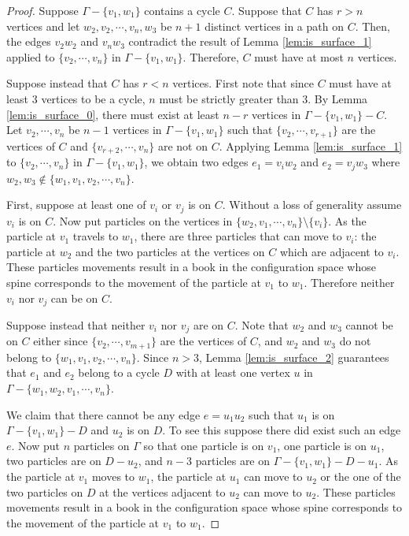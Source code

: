 \begin{proof}
Suppose \(\Gamma - \{v_1, w_1\}\) contains a cycle \(C\).
Suppose that \(C\) has \(r > n\) vertices and let \(w_2, v_2, \cdots, v_n, w_3\) be \(n+1\) distinct vertices in a path on \(C\).
Then, the edges \(v_2 w_2\) and \(v_n w_3\) contradict the result of 
Lemma \ref{lem:is_surface_1} applied to \(\{v_2, \cdots, v_n\}\) in \(\Gamma - \{v_1, w_1\}\).
Therefore, \(C\) must have at most \(n\) vertices.

Suppose instead that \(C\) has \(r < n\) vertices.
First note that since \(C\) must have at least \(3\) vertices to be a cycle, \(n\) must be strictly greater than \(3\).
By Lemma \ref{lem:is_surface_0}, there must exist at least \(n - r\) vertices in \(\Gamma - \{v_1, w_1\} - C\).
Let \(v_2, \cdots, v_n\) be \(n - 1\) vertices in \(\Gamma - \{v_1, w_1\}\) such that 
\(\{v_2, \cdots, v_{r + 1}\}\) are the vertices of \(C\) and \(\{v_{r + 2}, \cdots, v_n\}\) are not on \(C\).
Applying Lemma \ref{lem:is_surface_1} to \(\{v_2, \cdots, v_n\}\) in \(\Gamma - \{v_1, w_1\}\), 
we obtain two edges \(e_1 = v_i w_2\) and \(e_2 = v_j w_3\) where \(w_2, w_3 \not \in \{w_1, v_1, v_2, \cdots, v_n\}\).

First, suppose at least one of \(v_i\) or \(v_j\) is on \(C\). 
Without a loss of generality assume \(v_i\) is on \(C\). 
Now put particles on the vertices in \(\{w_2, v_1, \cdots, v_n\}\setminus\{v_i\}\).
As the particle at \(v_1\) travels to \(w_1\), 
there are three particles that can move to \(v_i\): 
the particle at \(w_2\) and the two particles at the vertices on \(C\) which are adjacent to \(v_i\).
These particles movements result in a book in the configuration space whose spine corresponds to the movement of the particle at \(v_1\) to \(w_1\).
Therefore neither \(v_i\) nor \(v_j\) can be on \(C\).

Suppose instead that neither \(v_i\) nor \(v_j\) are on \(C\).
Note that \(w_2\) and \(w_3\) cannot be on \(C\) either since 
\(\{v_2, \cdots, v_{m+1}\}\) are the vertices of \(C\),
and \(w_2\) and \(w_3\) do not belong to \(\{w_1, v_1, v_2, \cdots, v_n\}\).
Since \(n > 3\), Lemma \ref{lem:is_surface_2} guarantees that \(e_1\) and \(e_2\) belong to a cycle \(D\)
with at least one vertex \(u\) in \(\Gamma - \{w_1, w_2, v_1, \cdots, v_n\}\).

We claim that there cannot be any edge \(e = u_1 u_2\) such that \(u_1\) is on \(\Gamma - \{v_1, w_1\} - D\) and \(u_2\) is on \(D\).
To see this suppose there did exist such an edge \(e\).
Now put \(n\) particles on \(\Gamma\) so that 
one particle is on \(v_1\), one particle is on \(u_1\), two particles are on \(D - u_2\), 
and \(n - 3\) particles are on \(\Gamma - \{v_1, w_1\} - D - u_1\).
As the particle at \(v_1\) moves to \(w_1\), the particle at \(u_1\) can move to \(u_2\) or 
the one of the two particles on \(D\) at the vertices adjacent to \(u_2\) can move to \(u_2\).
These particles movements result in a book in the configuration space whose spine corresponds to the movement of the particle at \(v_1\) to \(w_1\).


\end{proof}

